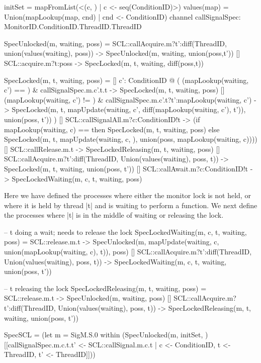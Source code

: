   \begin{cspm}
initSet = mapFromList(<(c, {}) | c <- seq(ConditionID)>)
values(map) = Union({mapLookup(map, cnd) | cnd <- ConditionID})
channel callSignalSpec: MonitorID.ConditionID.ThreadID.ThreadID

SpecUnlocked(m, waiting, poss) =
     SCL::callAcquire.m?t':diff(ThreadID, union(values(waiting), poss)) ->
       SpecUnlocked(m, waiting, union(poss,{t'}))
  [] SCL::acquire.m?t:poss -> SpecLocked(m, t, waiting, diff(poss,{t}))
      

SpecLocked(m, t, waiting, poss) =
  [] c': ConditionID @  
      (   
          (mapLookup(waiting, c') == {}) & callSignalSpec.m.c'.t.t ->
             SpecLocked(m, t, waiting, poss)
       [] (mapLookup(waiting, c') != {}) & 
            callSignalSpec.m.c'.t?t':mapLookup(waiting, c') -> 
              SpecLocked(m, t, 
                        mapUpdate(waiting, c', diff(mapLookup(waiting, c'), {t'})), 
                        union(poss, {t'}))
      )
  [] SCL::callSignalAll.m?c:ConditionID!t -> 
       (if mapLookup(waiting, c) == {} then 
            SpecLocked(m, t, waiting, poss) 
        else SpecLocked(m, t, mapUpdate(waiting, c, {}), 
                          union(poss, mapLookup(waiting, c))))
  [] SCL::callRelease.m.t -> 
        SpecLockedReleasing(m, t, waiting, poss)
  [] SCL::callAcquire.m?t':diff(ThreadID, 
                                Union({values(waiting), poss, {t}})) -> 
        SpecLocked(m, t, waiting, union(poss, {t'}))
  [] SCL::callAwait.m?c:ConditionID!t -> 
        SpecLockedWaiting(m, c, t, waiting, poss)
  \end{cspm}

  Here we have defined the processes where either the monitor lock is not held, or where it is held by thread |t| and is waiting to perform a function. We next define the processes where |t| is in the middle of waiting or releasing the lock.

  \begin{cspm}
-- t doing a wait; needs to release the lock
SpecLockedWaiting(m, c, t, waiting, poss) =
      SCL::release.m.t -> 
        SpecUnlocked(m, mapUpdate(waiting, c, union(mapLookup(waiting, c), {t})), 
                    poss)
  [] SCL::callAcquire.m?t':diff(ThreadID, 
                                Union({values(waiting), poss, {t}})) ->
        SpecLockedWaiting(m, c, t, waiting, union(poss, {t'}))

-- t releasing the lock
SpecLockedReleasing(m, t, waiting, poss) =
      SCL::release.m.t -> SpecUnlocked(m, waiting, poss)
  [] SCL::callAcquire.m?t':diff(ThreadID, 
                                Union({values(waiting), poss, {t}})) ->
        SpecLockedReleasing(m, t, waiting, union(poss, {t'}))

SpecSCL = (let m = SigM.S.0 within 
            (SpecUnlocked(m, initSet, {}) 
              [[callSignalSpec.m.c.t.t' <- SCL::callSignal.m.c.t 
                  | c <- ConditionID, t <- ThreadID, t' <- ThreadID]]))
  \end{cspm}

